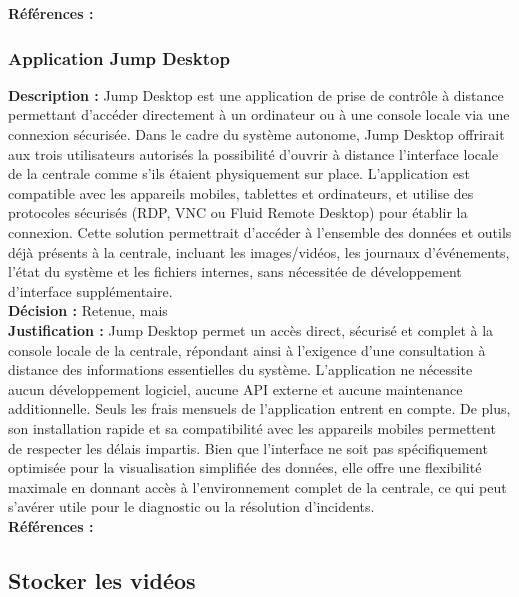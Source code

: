 \noindent
\textbf{Références :} \cite{16} \cite{17} \cite{18} \cite{19} \\

\subsubsection{Application Jump Desktop}

\noindent
\textbf{Description :} Jump Desktop est une application de prise de contrôle à distance
permettant d’accéder directement à un ordinateur ou à une console locale via
une connexion sécurisée. Dans le cadre du système autonome, Jump Desktop
offrirait aux trois utilisateurs autorisés la possibilité d’ouvrir à distance
l’interface locale de la centrale comme s’ils étaient physiquement sur place.
L’application est compatible avec les appareils mobiles, tablettes et
ordinateurs, et utilise des protocoles sécurisés (RDP, VNC ou Fluid Remote
Desktop) pour établir la connexion. Cette solution permettrait d’accéder à
l’ensemble des données et outils déjà présents à la centrale, incluant les
images/vidéos, les journaux d’événements, l’état du système et les fichiers
internes, sans nécessitée de développement d’interface supplémentaire. \\

\noindent
\textbf{Décision :} Retenue, mais \\

\noindent
\textbf{Justification :} Jump Desktop permet un accès direct, sécurisé
et complet à la console locale de la centrale, répondant ainsi à l’exigence
d’une consultation à distance des informations essentielles du système.
L’application ne nécessite aucun développement logiciel, aucune API externe et
aucune maintenance additionnelle. Seuls les frais mensuels de l’application
entrent en compte. De plus, son installation rapide et sa compatibilité avec
les appareils mobiles permettent de respecter les délais impartis. Bien que
l’interface ne soit pas spécifiquement optimisée pour la visualisation
simplifiée des données, elle offre une flexibilité maximale en donnant accès à
l’environnement complet de la centrale, ce qui peut s’avérer utile pour le
diagnostic ou la résolution d’incidents. \\

\noindent
\textbf{Références :} \cite{20} \cite{21} \\



\subsection{Stocker les vidéos}

